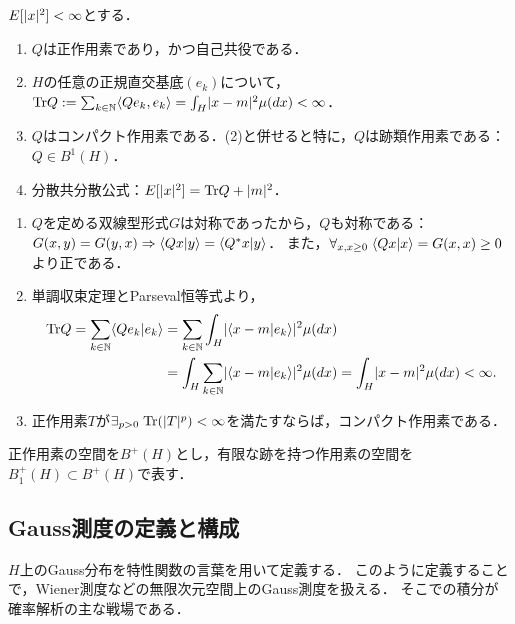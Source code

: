 \documentclass[uplatex,dvipdfmx]{jsreport}
\begin{document}
\begin{lemma}[共分散作用素の性質]
    $E[\lvert x\rvert^2]<\infty$とする．
    \begin{enumerate}
        \item $Q$は正作用素であり，かつ自己共役である．
        \item $H$の任意の正規直交基底$(e_k)$について，$\mathrm{Tr} Q:=\sum_{k\in\mathbb{N}}\langle Qe_k,e_k\rangle=\int_H\lvert x-m\rvert^2\mu(dx)<\infty$．
        \item $Q$はコンパクト作用素である．(2)と併せると特に，$Q$は跡類作用素である：$Q\in B^1(H)$．
        \item 分散共分散公式：$E[\lvert x\rvert^2]=\mathrm{Tr} Q+\lvert m\rvert^2$．
    \end{enumerate}
\end{lemma}
\begin{Proof}\mbox{}
    \begin{enumerate}
        \item $Q$を定める双線型形式$G$は対称であったから，$Q$も対称である：$G(x,y)=G(y,x)\Rightarrow\langle Qx|y\rangle=\langle Q^*x|y\rangle$．
        また，$\forall_{x,x\ge0}\;\langle Qx|x\rangle=G(x,x)\ge0$より正である．
        \item 単調収束定理とParseval恒等式より，
        \begin{align*}
            \mathrm{Tr} Q=\sum_{k\in\mathbb{N}}\langle Qe_k|e_k\rangle&=\sum_{k\in\mathbb{N}}\int_H\lvert\langle x-m|e_k\rangle\rvert^2\mu(dx)\\
            &=\int_H\sum_{k\in\mathbb{N}}\lvert\langle x-m|e_k\rangle\rvert^2\mu(dx)=\int_H\lvert x-m\rvert^2\mu(dx)<\infty.
        \end{align*}
        \item 正作用素$T$が$\exists_{p>0}\;\mathrm{Tr}(\lvert T\rvert^p)<\infty$を満たすならば，コンパクト作用素である．
    \end{enumerate}
\end{Proof}

\begin{notation}
    正作用素の空間を$B^+(H)$とし，有限な跡を持つ作用素の空間を$B^+_1(H)\subset B^+(H)$で表す．
\end{notation}

\subsection{Gauss測度の定義と構成}

\begin{tcolorbox}[colframe=ForestGreen, colback=ForestGreen!10!white,breakable,colbacktitle=ForestGreen!40!white,coltitle=black,fonttitle=\bfseries\sffamily,
title=]
    $H$上のGauss分布を特性関数の言葉を用いて定義する．
    このように定義することで，Wiener測度などの無限次元空間上のGauss測度を扱える．
    そこでの積分が確率解析の主な戦場である．
\end{tcolorbox}
\end{document}
